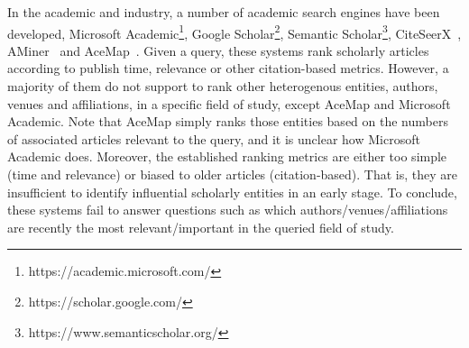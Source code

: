 In the academic and industry, a number of academic search engines have been developed, \eg Microsoft Academic\footnote{https://academic.microsoft.com/}, Google Scholar\footnote{https://scholar.google.com/}, Semantic Scholar\footnote{https://www.semanticscholar.org/}, CiteSeerX~\cite{li2006citeseerx}, AMiner~\cite{tang2008arnetminer} and AceMap~\cite{tan2016acemap}.
%
Given a query, these systems rank scholarly articles according to publish time, relevance or other citation-based metrics. %
%
However, a majority of them do not support to rank other heterogenous entities, \eg authors, venues and affiliations, in a specific field of study, except AceMap and Microsoft Academic. Note that AceMap simply ranks those entities  based on the numbers of associated articles relevant to the query, and it is unclear how Microsoft Academic does. Moreover, the established ranking metrics are either too simple (\eg time and relevance) or biased to older articles (\eg citation-based). That is, they are insufficient to identify influential scholarly entities in an early stage.
%
To conclude, these systems fail to answer questions such as which authors/venues/affiliations are recently the most relevant/important in the queried field of study.




